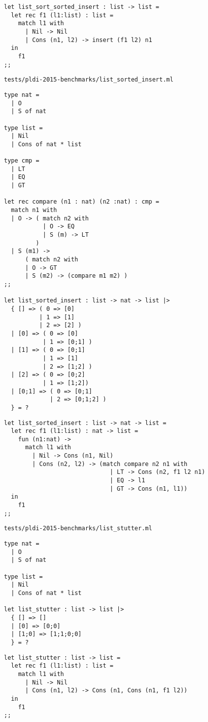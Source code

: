 \begin{verbatim}
let list_sort_sorted_insert : list -> list =
  let rec f1 (l1:list) : list =
    match l1 with
      | Nil -> Nil
      | Cons (n1, l2) -> insert (f1 l2) n1
  in
    f1
;;
\end{verbatim}

\noindent\large\texttt{tests/pldi-2015-benchmarks/list\_sorted\_insert.ml}
\begin{verbatim}
type nat =
  | O
  | S of nat

type list =
  | Nil
  | Cons of nat * list

type cmp =
  | LT
  | EQ
  | GT

let rec compare (n1 : nat) (n2 :nat) : cmp =
  match n1 with
  | O -> ( match n2 with
           | O -> EQ
           | S (m) -> LT
         )
  | S (m1) ->
      ( match n2 with
      | O -> GT
      | S (m2) -> (compare m1 m2) )
;;

let list_sorted_insert : list -> nat -> list |>
  { [] => ( 0 => [0]
          | 1 => [1]
          | 2 => [2] )
  | [0] => ( 0 => [0]
           | 1 => [0;1] )
  | [1] => ( 0 => [0;1]
           | 1 => [1]
           | 2 => [1;2] )
  | [2] => ( 0 => [0;2]
           | 1 => [1;2])
  | [0;1] => ( 0 => [0;1]
             | 2 => [0;1;2] )
  } = ?
\end{verbatim}

\begin{verbatim}
let list_sorted_insert : list -> nat -> list =
  let rec f1 (l1:list) : nat -> list =
    fun (n1:nat) ->
      match l1 with
        | Nil -> Cons (n1, Nil)
        | Cons (n2, l2) -> (match compare n2 n1 with
                              | LT -> Cons (n2, f1 l2 n1)
                              | EQ -> l1
                              | GT -> Cons (n1, l1))
  in
    f1
;;
\end{verbatim}

\noindent\large\texttt{tests/pldi-2015-benchmarks/list\_stutter.ml}
\begin{verbatim}
type nat =
  | O
  | S of nat

type list =
  | Nil
  | Cons of nat * list

let list_stutter : list -> list |>
  { [] => []
  | [0] => [0;0]
  | [1;0] => [1;1;0;0]
  } = ?
\end{verbatim}

\begin{verbatim}
let list_stutter : list -> list =
  let rec f1 (l1:list) : list =
    match l1 with
      | Nil -> Nil
      | Cons (n1, l2) -> Cons (n1, Cons (n1, f1 l2))
  in
    f1
;;
\end{verbatim}

